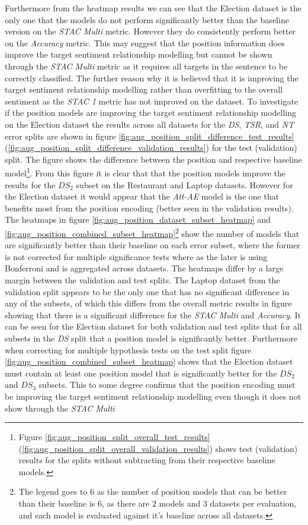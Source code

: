 Furthermore from the heatmap results we can see that the Election dataset is the only one that the models do not perform significantly better than the baseline version on the \textit{STAC Multi} metric. However they do consistently perform better on the \textit{Accuracy} metric. This may suggest that the position information does improve the target sentiment relationship modelling but cannot be shown through the \textit{STAC Multi} metric as it requires all targets in the sentence to be correctly classified. The further reason why it is believed that it is improving the target sentiment relationship modelling rather than overfitting to the overall sentiment as the \textit{STAC 1} metric has not improved on the dataset. To investigate if the position models are improving the target sentiment relationship modelling on the Election dataset the results across all datasets for the \textit{DS}, \textit{TSR}, and \textit{NT} error splits are shown in figure \ref{fig:aug_position_split_difference_test_results} (\ref{fig:aug_position_split_difference_validation_results}) for the test (validation) split. The figure shows the difference between the position and respective baseline model\footnote{Figure \ref{fig:aug_position_split_overall_test_results} (\ref{fig:aug_position_split_overall_validation_results}) shows test (validation) results for the splits without subtracting from their respective baseline models.}. From this figure it is clear that that the position models improve the results for the $DS_2$ subset on the Restaurant and Laptop datasets. However for the Election dataset it would appear that the \textit{Att-AE} model is the one that benefits most from the position encoding (better seen in the validation results). The heatmaps in figure \ref{fig:aug_position_dataset_subset_heatmap} and \ref{fig:aug_position_combined_subset_heatmap}\footnote{The legend goes to $6$ as the number of position models that can be better than their baseline is $6$, as there are $2$ models and $3$ datasets per evaluation, and each model is evaluated against it's baseline across all datasets.} show the number of models that are significantly better than their baseline on each error subset, where the former is not corrected for multiple significance tests where as the later is using Bonferroni and is aggregated across datasets. The heatmaps differ by a large margin between the validation and test splits. The Laptop dataset from the validation split appears to be the only one that has no significant difference in any of the subsets, of which this differs from the overall metric results in figure showing that there is a significant difference for the \textit{STAC Multi} and \textit{Accuracy}. It can be seen for the Election dataset for both validation and test splits that for all subsets in the \textit{DS} split that a position model is significantly better. Furthermore when correcting for multiple hypothesis tests on the test split figure \ref{fig:aug_position_combined_subset_heatmap} shows that the Election dataset must contain at least one position model that is significantly better for the $DS_2$ and $DS_3$ subsets. This to some degree confirms that the position encoding must be improving the target sentiment relationship modelling even though it does not show through the \textit{STAC Multi} 